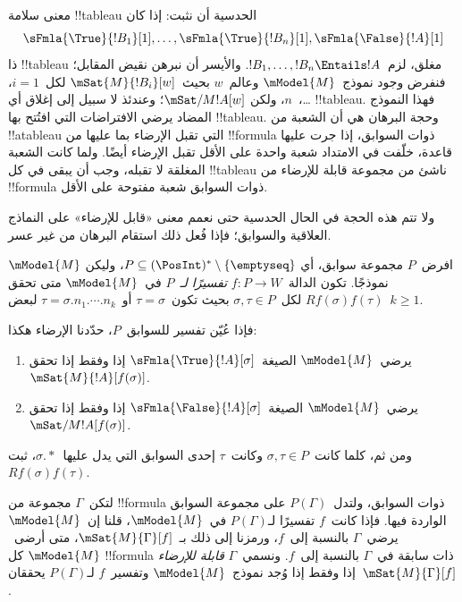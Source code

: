 \documentclass[../../../include/open-logic-section]{subfiles}
\begin{document}


\begin{explain}
  معنى سلامة !!{tableau} الحدسية أن نثبت: إذا كان
  \[
  \sFmla{\True}{!B_1}[1], \dots, \sFmla{\True}{!B_n}[1], \sFmla{\False}{!A}[1]
  \]
  ذا !!{tableau} مغلق، لزم~$!B_1, \dots, !B_n \Entails !A$.
  والأيسر أن نبرهن نقيض المقابل؛ فنفرض وجود نموذج~$\mModel{M}$ وعالم~$w$
  بحيث~$\mSat{M}{!B_i}[w]$ لكل~$i=1$، \dots،~$n$، ولكن
  $\mSat/{M}{!A}[w]$؛ وعندئذ لا سبيل إلى إغلاق أي !!{tableau}. فهذا
  النموذج المضاد يرضي الافتراضات التي افتُتح بها !!{tableau}. وحجة
  البرهان هي أن الشعبة من !!a{tableau} التي تقبل الإرضاء بما عليها من !!{formula} ذوات
  السوابق، إذا جرت عليها قاعدة، خلّفت في الامتداد شعبة واحدة على الأقل
  تقبل الإرضاء أيضًا. ولما كانت الشعبة المغلقة لا تقبله، وجب أن يبقى في
  كل !!{tableau} ناشئ من مجموعة قابلة للإرضاء من !!{formula} ذوات
  السوابق شعبة مفتوحة على الأقل.

  ولا تتم هذه الحجة في الحال الحدسية حتى نعمم معنى «قابل للإرضاء» على
  النماذج العلاقية والسوابق؛ فإذا فُعل ذلك استقام البرهان من غير عسر.
\end{explain}

\begin{defn}
  افرض~$P$ مجموعة سوابق، أي
  $P \subseteq (\PosInt)^* \setminus \{\emptyseq\}$، وليكن
  $\mModel{M}$ نموذجًا. تكون الدالة~$f\colon P \to W$
  \emph{تفسيرًا لـ}~$P$ في~$\mModel{M}$ متى تحقق
  $Rf(\sigma)f(\tau)$ لكل~$\sigma,\tau\in P$ بحيث تكون~$\tau=\sigma$
  أو~$\tau=\sigma.n_1.\cdots.n_k$ لبعض~$k\geq 1$.

  فإذا عُيّن تفسير للسوابق~$P$، حدّدنا الإرضاء هكذا:
  \begin{enumerate}
  \item يرضي~$\mModel{M}$ الصيغة~$\sFmla{\True}{!A}[\sigma]$ إذا وفقط
    إذا تحقق~$\mSat{M}{!A}[f(\sigma)]$.
  \item يرضي~$\mModel{M}$ الصيغة~$\sFmla{\False}{!A}[\sigma]$ إذا وفقط
    إذا تحقق~$\mSat/{M}{!A}[f(\sigma)]$.
  \end{enumerate}
\end{defn}

ومن ثم، كلما كانت~$\sigma,\tau\in P$ وكانت~$\tau$ إحدى السوابق التي
يدل عليها~$\sigma.{*}$، ثبت~$Rf(\sigma)f(\tau)$.

\begin{defn}
  لتكن~$\Gamma$ مجموعة من !!{formula} ذوات السوابق، ولتدل~$P(\Gamma)$
  على مجموعة السوابق الواردة فيها. فإذا كانت~$f$ تفسيرًا لـ$P(\Gamma)$
  في~$\mModel{M}$، قلنا إن~$\mModel{M}$ يرضي~$\Gamma$ بالنسبة إلى~$f$،
  ورمزنا إلى ذلك بـ~$\mSat{M}{\Gamma}[f]$، متى أرضى~$\mModel{M}$ كل
  !!{formula} ذات سابقة في~$\Gamma$ بالنسبة إلى~$f$. ونسمي~$\Gamma$
  \emph{قابلة للإرضاء} إذا وفقط إذا وُجد نموذج~$\mModel{M}$ وتفسير~$f$
  لـ$P(\Gamma)$ يحققان~$\mSat{M}{\Gamma}[f]$.
\end{defn}
\end{document}
